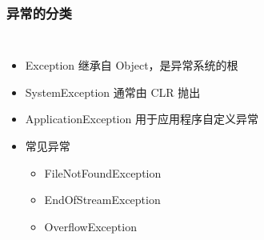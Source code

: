 
\begin{frame}
\frametitle{异常的分类}
\begin{columns}
  \begin{itemize}
  \item Exception 继承自 Object，是异常系统的根
  \item SystemException 通常由 CLR 抛出
  \item ApplicationException 用于应用程序自定义异常
  \item 常见异常
    \begin{itemize}
    \item FileNotFoundException
    \item EndOfStreamException
    \item OverflowException
    \end{itemize}
  \end{itemize}
  
\end{columns}
\end{frame}

